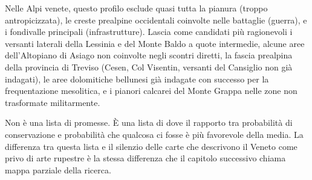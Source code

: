 Nelle Alpi venete, questo profilo esclude quasi tutta la pianura (troppo antropicizzata), le creste prealpine occidentali coinvolte nelle battaglie (guerra), e i fondivalle principali (infrastrutture). Lascia come candidati più ragionevoli i versanti laterali della Lessinia e del Monte Baldo a quote intermedie, alcune aree dell'Altopiano di Asiago non coinvolte negli scontri diretti, la fascia prealpina della provincia di Treviso (Cesen, Col Visentin, versanti del Cansiglio non già indagati), le aree dolomitiche bellunesi già indagate con successo per la frequentazione mesolitica, e i pianori calcarei del Monte Grappa nelle zone non trasformate militarmente.

Non è una lista di promesse. È una lista di dove il rapporto tra probabilità di conservazione e probabilità che qualcosa ci fosse è più favorevole della media. La differenza tra questa lista e il silenzio delle carte che descrivono il Veneto come privo di arte rupestre è la stessa differenza che il capitolo successivo chiama mappa parziale della ricerca.
\fi
